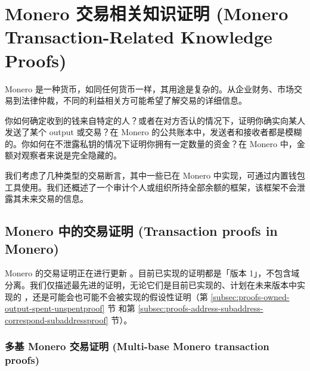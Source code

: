 \chapter{Monero 交易相关知识证明 (Monero Transaction-Related Knowledge Proofs)}
\label{chapter:tx-knowledge-proofs}

Monero 是一种货币，如同任何货币一样，其用途是复杂的。从企业财务、市场交易到法律仲裁，不同的利益相关方可能希望了解交易的详细信息。

你如何确定收到的钱来自特定的人？或者在对方否认的情况下，证明你确实向某人发送了某个 output 或交易？在 Monero 的公共账本中，发送者和接收者都是模糊的。你如何在不泄露私钥的情况下证明你拥有一定数量的资金？在 Monero 中，金额对观察者来说是完全隐藏的。

我们考虑了几种类型的交易断言，其中一些已在 Monero 中实现，可通过内置钱包工具使用。我们还概述了一个审计个人或组织所持全部余额的框架，该框架不会泄露其未来交易的信息。



\section{Monero 中的交易证明 (Transaction proofs in Monero)}
\label{sec:proofs-monero-proofs}

Monero 的交易证明正在进行更新 \cite{sarang-txproofs-updates-issue}。目前已实现的证明都是「版本 1」，不包含域分离。我们仅描述最先进的证明，无论它们是目前已实现的、计划在未来版本中实现的 \cite{sarang-txproofs-v2-update-pr}，还是可能会也可能不会被实现的假设性证明（第 \ref{subsec:proofs-owned-output-spent-unspentproof} 节 \cite{unspent-proof-issue-68} 和第 \ref{subsec:proofs-address-subaddress-correspond-subaddressproof} 节）。


\subsection{多基 Monero 交易证明 (Multi-base Monero transaction proofs)}
\label{subsec:proofs-multi-base-monero}

